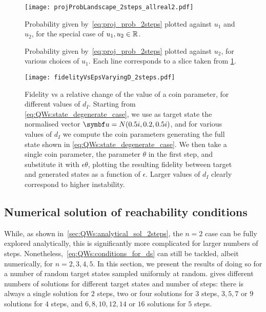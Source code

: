 \begin{figure}[tb]
	\centering
	\texttt{[image: projProbLandscape\_2steps\_allreal2.pdf]}
	\caption{
		Probability given by~\cref{eq:proj_prob_2steps} plotted against $u_1$ and $u_2$, for the special case of $u_1, u_2 \in {\mathbb{R}}$.
	}
	\label{fig:proj_prob_landscape_plot3d}
\end{figure}
\begin{figure}[tb]
	\centering
	\caption{
		Probability given by~\cref{eq:proj_prob_2steps} plotted against $u_2$, for various choices of $u_1$.
		Each line corresponds to a slice taken from \cref{fig:proj_prob_landscape_plot3d}.}
	\label{fig:proj_prob_landscape_slices}
\end{figure}
\begin{figure}[tb]
	\centering
	\texttt{[image: fidelityVsEpsVaryingD\_2steps.pdf]}
	\caption{
		Fidelity vs a relative change of the value of a coin parameter, for different values of $d_I$.
		Starting from \cref{eq:QWs:state_degenerate_case}, we use as target state the normalised vector
		$\bs u = N (0.5 i, 0.2, 0.5 i)$, and for various values of $d_I$ we compute the coin parameters generating the full state shown in \cref{eq:QWs:state_degenerate_case}.
		We then take a single coin parameter, the parameter $\theta$ in the first step, and substitute it with $\epsilon \theta$, plotting the resulting fidelity between target and generated states as a function of $\epsilon$.
		Larger values of $d_I$ clearly correspond to higher instability.
	}
	\label{fig:fid_vs_eps_varying_d}
\end{figure}

\subsection{Numerical solution of reachability conditions}
\label{sec:QWs:numerical_solution_reachability_conditions}

While, as shown in~\cref{sec:QWs:analytical_sol_2steps}, the $n=2$ case can be fully explored analytically, this is significantly more complicated for larger numbers of steps. Nonetheless,~\cref{eq:QWs:conditions_for_ds} can still be tackled, albeit numerically, for $n=2,3,4,5$.
In this section, we present the results of doing so for a number of random target states sampled uniformly at random.
 gives different numbers of solutions for different target states and number of steps:
there is always a single solution for $2$ steps, two or four solutions for $3$ steps, $3, 5, 7$ or $9$ solutions for $4$ steps, and $6, 8, 10, 12, 14$ or $16$ solutions for $5$ steps.

